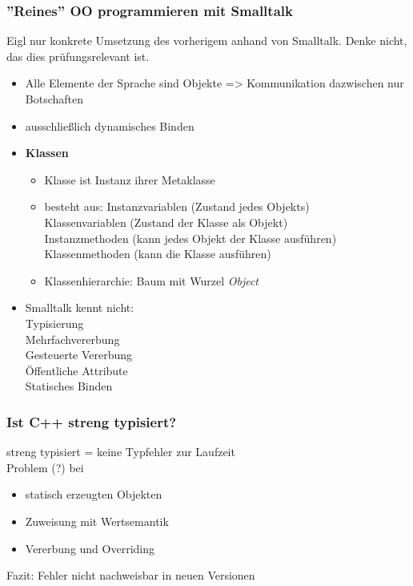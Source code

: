 \subsubsection{''Reines'' OO programmieren mit Smalltalk}
Eigl nur konkrete Umsetzung des vorherigem anhand von Smalltalk. Denke nicht, das dies prüfungsrelevant ist.
\begin{itemize}
	\item Alle  Elemente der Sprache sind Objekte => Kommunikation dazwischen nur Botschaften
	\item ausschließlich dynamisches Binden
	\item \textbf{Klassen}
	\begin{itemize}
		\item Klasse ist Instanz ihrer Metaklasse
		\item besteht aus: Instanzvariablen (Zustand jedes Objekts)\\
		Klassenvariablen (Zustand der Klasse als Objekt)\\
		Instanzmethoden (kann jedes Objekt der Klasse ausführen)\\
		Klassenmethoden (kann die Klasse ausführen)
		\item Klassenhierarchie: Baum mit Wurzel \textit{Object}
	\end{itemize}
	
	\item Smalltalk kennt nicht:\\
	Typisierung\\
	Mehrfachvererbung\\
	Gesteuerte Vererbung\\
	Öffentliche Attribute\\
	Statisches Binden
\end{itemize}

\subsubsection{Ist C++ streng typisiert?}
streng typisiert = keine Typfehler zur Laufzeit\\
Problem (?) bei
\begin{itemize}
	\item statisch erzeugten Objekten
	\item Zuweisung mit Wertsemantik
	\item Vererbung und Overriding
\end{itemize}
Fazit: Fehler nicht nachweisbar in neuen Versionen 

